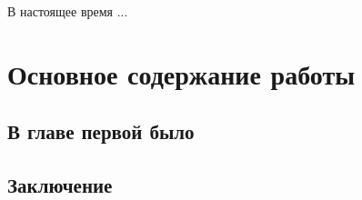 \documentclass[14pt]{extreport}
\begin{document}
\tableofcontents
\intro

В настоящее время ...


\chapter{Основное содержание работы}
\section{В главе первой было}
\section{Заключение}
\end{document}
